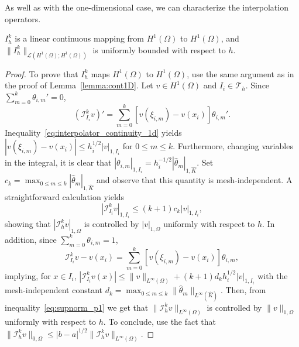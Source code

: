 As well as with the one-dimensional case, we can characterize the interpolation operators.
\begin{lemma}\label{lemma:contkD}
    $I_h^k$ is a linear continuous mapping from $H^1(\Omega)$ to $H^1(\Omega)$, and $\|I_h^k\|_{\mathcal{L}(H^1(\Omega);H^1(\Omega))}$ is uniformly bounded with respect to $h$.
    \begin{proof}
        To prove that $I_h^k$ maps $H^1(\Omega)$ to $H^1(\Omega)$, use the same argument as in the proof of Lemma~\ref{lemma:cont1D}.
        Let $v \in H^1(\Omega)$ and $I_i \in \mathcal{T}_h$. Since $\sum_{m=0}^k \theta_{i,m}' = 0$,
        \begin{equation*}
            (\mathcal{I}_{I_i}^k v)' = \sum_{m=0}^k [v(\xi_{i,m}) - v(x_i)] \theta_{i,m}'.
        \end{equation*}
        Inequality~\ref{eq:interpolator_continuity_1d} yields $|v(\xi_{i,m}) - v(x_i)| \le h_i^{1/2} |v|_{1,I_i}$ for $0 \le m \le k$. Furthermore, changing variables in the integral, it is clear that $|\theta_{i,m}|_{1,I_i} = h_i^{-1/2} |\hat{\theta}_m|_{1,\hat{K}}$. Set $c_k = \max_{0 \le m \le k} |\hat{\theta}_m|_{1,\hat{K}}$ and observe that this quantity is mesh-independent. A straightforward calculation yields
        \begin{equation*}
            |\mathcal{I}_{I_i}^k v|_{1,I_i} \le (k+1) c_k |v|_{1,I_i},
        \end{equation*}
        showing that $|\mathcal{I}_h^k v|_{1,\Omega}$ is controlled by $|v|_{1,\Omega}$ uniformly with respect to $h$. In addition, since $\sum_{m=0}^k \theta_{i,m} = 1$,
        \begin{equation*}
            \mathcal{I}_{I_i}^k v - v(x_i) = \sum_{m=0}^k [v(\xi_{i,m}) - v(x_i)] \theta_{i,m},
        \end{equation*}
        implying, for $x \in I_i$, $|\mathcal{I}_{I_i}^k v(x)| \le \|v\|_{L^\infty(\Omega)} + (k+1) d_k h_i^{1/2} |v|_{1,I_i}$ with the mesh-independent constant $d_k = \max_{0 \le m \le k} \|\hat{\theta}_m\|_{L^\infty(\hat{K})}$. Then, from inequality~\ref{eq:supnorm_p1} we get that $\|\mathcal{I}_h^k v\|_{L^\infty(\Omega)}$ is controlled by $\|v\|_{1,\Omega}$ uniformly with respect to $h$. To conclude, use the fact that $\|\mathcal{I}_h^k v\|_{0,\Omega} \le |b-a|^{1/2} \|\mathcal{I}_h^k v\|_{L^\infty(\Omega)}$.
    \end{proof}
\end{lemma}
